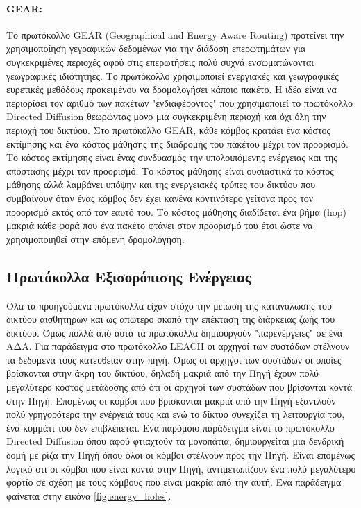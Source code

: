\paragraph{GEAR: } Το πρωτόκολλο GEAR (Geographical and Energy Aware Routing) \cite{gear_protocol} προτείνει την χρησιμοποίηση γεγραφικών δεδομένων για την διάδοση
επερωτημάτων για συγκεκριμένες περιοχές αφού στις επερωτήσεις πολύ συχνά ενσωματώνονται γεωγραφικές ιδιότητηες. Το πρωτόκολλο χρησιμοποιεί ενεργιακές και γεωγραφικές
ευρετικές μεθόδους προκειμένου να δρομολογήσει κάποιο πακέτο. Η ιδέα είναι να περιορίσει τον αριθμό των πακέτων "ενδιαφέροντος" που χρησιμοποιεί το πρωτόκολλο
Directed Diffusion \cite{directed_diffusion} θεωρώντας μονο μια συγκεκριμένη περιοχή και όχι όλη την περιοχή του δικτύου. Στο πρωτόκολλο GEAR, κάθε κόμβος κρατάει
ένα κόστος εκτίμησης και ένα κόστος μάθησης της διαδρομής του πακέτου μέχρι τον προορισμό. Το κόστος εκτίμησης είναι ένας συνδυασμός την υπολοιπόμενης ενέργειας και
της απόστασης μέχρι τον προορισμό. Το κόστος μάθησης είναι ουσιαστικά το κόστος μάθησης αλλά λαμβάνει υπόψην και της ενεργειακές τρύπες του δικτύου που συμβαίνουν
όταν ένας κόμβος δεν έχει κανένα κοντινότερο γείτονα προς τον προορισμό εκτός από τον εαυτό του. Το κόστος μάθησης διαδίδεται ένα βήμα (hop) μακριά κάθε φορά που ένα
πακέτο φτάνει στον προορισμό του έτσι ώστε να χρησιμοποιηθεί στην επόμενη δρομολόγηση.




\subsection{Πρωτόκολλα Εξισορόπισης Ενέργειας}
Όλα τα προηγούμενα πρωτόκολλα είχαν στόχο την μείωση της κατανάλωσης του δικτύου αισθητήρων και ως απώτερο σκοπό την επέκταση της διάρκειας ζωής του δικτύου.
Όμως πολλά από αυτά τα πρωτόκολλα δημιουργούν "παρενέργειες" σε ένα ΑΔΑ.
Για παράδειγμα στο πρωτόκολλο LEACH \cite{leach_protocol} οι αρχηγοί των συστάδων στέλνουν τα δεδομένα τους κατευθείαν στην πηγή. Όμως οι αρχηγοί των συστάδων οι
οποίες βρίσκονται στην άκρη του δικτύου, δηλαδή μακριά από την Πηγή έχουν πολύ μεγαλύτερο κόστος μετάδοσης από ότι οι αρχηγοί των συστάδων που βρίσονται κοντά στην
Πηγή.
Επομένως οι κόμβοι που βρίσκονται μακριά από την Πηγή εξαντλούν πολύ γρηγορότερα την ενέργειά τους και ενώ το δίκτυο συνεχίζει τη λειτουργία του, ένα κομμάτι
του δεν επιβλέπεται.
Ενα παρόμοιο παράδειγμα είναι το πρωτόκολλο Directed Diffusion \cite{directed_diffusion} όπου αφού φτιαχτούν τα μονοπάτια, δημιουργείται μια δενδρική δομή με ρίζα την
Πηγή όπου όλοι οι κόμβοι στέλνουν προς την Πηγή.
Είναι επομένως λογικό οτι οι κόμβοι που είναι κοντά στην Πηγή, αντιμετωπίζουν ένα πολύ μεγαλύτερο φορτίο σε σχέση με τους κόμβους που είναι μακρία από την αυτή.
Ένα παράδειγμα φαίνεται στην εικόνα \ref{fig:energy_holes}.

